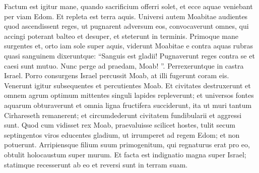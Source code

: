 \begin{biblechapter}
\begin{biblechapter}
\begin{biblechapter}
\verse Factum est igitur mane, quando sacrificium offerri solet, et ecce aquae veniebant per viam Edom. Et repleta est terra aquis.
 \verse Universi autem Moabitae audientes quod ascendissent reges, ut pugnarent adversum eos, convocaverunt omnes, qui accingi poterant balteo et desuper, et steterunt in terminis. 
\verse Primoque mane surgentes et, orto iam sole super aquis, viderunt Moabitae e contra aquas rubras quasi sanguinem 
\verse dixeruntque: “Sanguis est gladii! Pugnaverunt reges contra se et caesi sunt mutuo. Nunc perge ad praedam, Moab! ”. 
\verse Perrexeruntque in castra Israel. Porro consurgens Israel percussit Moab, at illi fugerunt coram eis. Venerunt igitur subsequentes et percutientes Moab. 
\verse Et civitates destruxerunt et omnem agrum optimum mittentes singuli lapides repleverunt; et universos fontes aquarum obturaverunt et omnia ligna fructifera succiderunt, ita ut muri tantum Cirhareseth remanerent; et circumdederunt civitatem fundibularii et aggressi sunt. 
\verse Quod cum vidisset rex Moab, praevaluisse scilicet hostes, tulit secum septingentos viros educentes gladium, ut irrumperet ad regem Edom; et non potuerunt. 
\verse Arripiensque filium suum primogenitum, qui regnaturus erat pro eo, obtulit holocaustum super murum. Et facta est indignatio magna super Israel; statimque recesserunt ab eo et reversi sunt in terram suam.
 

\end{biblechapter}
\end{biblechapter}
\end{biblechapter}
